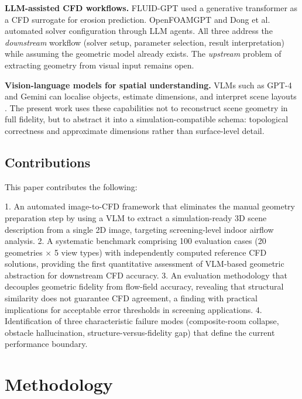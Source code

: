 \documentclass[preprint,12pt,number]{elsarticle}
\begin{document}
\textbf{LLM-assisted CFD workflows.} FLUID-GPT \cite{yang.etal2023FLUIDGPTFast} used a generative transformer as a CFD surrogate for erosion prediction. OpenFOAMGPT \cite{pandey.etal2025OpenFOAMGPTRetrievalaugmented} and Dong et al. \cite{dong.etal2025FinetuningLarge} automated solver configuration through LLM agents. All three address the \textit{downstream} workflow (solver setup, parameter selection, result interpretation) while assuming the geometric model already exists. The \textit{upstream} problem of extracting geometry from visual input remains open.

\textbf{Vision-language models for spatial understanding.} VLMs such as GPT-4 \cite{openai.etal2023GPT4Technical} and Gemini \cite{geminiteam.etal2023GeminiFamily} can localise objects, estimate dimensions, and interpret scene layouts \cite{chen.etal2024SpatialVLMEndowing,hong.etal20233DLLMInjecting}. The present work uses these capabilities not to reconstruct scene geometry in full fidelity, but to abstract it into a simulation-compatible schema: topological correctness and approximate dimensions rather than surface-level detail.

\subsection{Contributions}
\label{sec:contributions}


This paper contributes the following:

1. An automated image-to-CFD framework that eliminates the manual geometry preparation step by using a VLM to extract a simulation-ready 3D scene description from a single 2D image, targeting screening-level indoor airflow analysis.
2. A systematic benchmark comprising 100 evaluation cases (20 geometries $\times$ 5 view types) with independently computed reference CFD solutions, providing the first quantitative assessment of VLM-based geometric abstraction for downstream CFD accuracy.
3. An evaluation methodology that decouples geometric fidelity from flow-field accuracy, revealing that structural similarity does not guarantee CFD agreement, a finding with practical implications for acceptable error thresholds in screening applications.
4. Identification of three characteristic failure modes (composite-room collapse, obstacle hallucination, structure-versus-fidelity gap) that define the current performance boundary.


\section{Methodology}
\label{sec:methodology}
\end{document}

